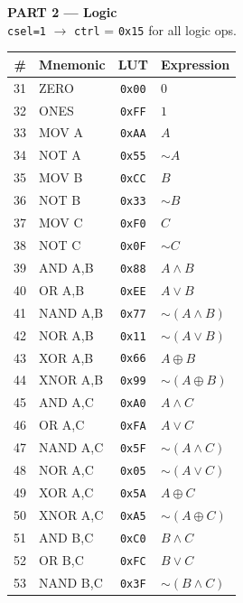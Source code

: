 \documentclass[10pt,landscape,a4paper]{article}
\begin{document}
\begin{minipage}[t]{0.22\textwidth}
        \textbf{\large \textcolor{logiccolor}{PART 2 --- Logic}} \\
    {\tiny \texttt{csel=1} $\rightarrow$ \texttt{ctrl} = \texttt{0x15} for all logic ops.}\\[0.4em]
    \scriptsize
    \begin{tabular}{@{}rlcl@{}}
    \toprule
    \textbf{\#} & \textbf{Mnemonic} & \textbf{LUT} & \textbf{Expression} \\
    \midrule
    31 & ZERO & \texttt{0x00} & $0$ \\
    32 & ONES & \texttt{0xFF} & $1$ \\
    33 & MOV A & \texttt{0xAA} & $A$ \\
    34 & NOT A & \texttt{0x55} & $\sim A$ \\
    35 & MOV B & \texttt{0xCC} & $B$ \\
    36 & NOT B & \texttt{0x33} & $\sim B$ \\
    37 & MOV C & \texttt{0xF0} & $C$ \\
    38 & NOT C & \texttt{0x0F} & $\sim C$ \\
    39 & AND A,B & \texttt{0x88} & $A \wedge B$ \\
    40 & OR A,B & \texttt{0xEE} & $A \vee B$ \\
    41 & NAND A,B & \texttt{0x77} & $\sim(A \wedge B)$ \\
    42 & NOR A,B & \texttt{0x11} & $\sim(A \vee B)$ \\
    43 & XOR A,B & \texttt{0x66} & $A \oplus B$ \\
    44 & XNOR A,B & \texttt{0x99} & $\sim(A \oplus B)$ \\
    45 & AND A,C & \texttt{0xA0} & $A \wedge C$ \\
    46 & OR A,C & \texttt{0xFA} & $A \vee C$ \\
    47 & NAND A,C & \texttt{0x5F} & $\sim(A \wedge C)$ \\
    48 & NOR A,C & \texttt{0x05} & $\sim(A \vee C)$ \\
    49 & XOR A,C & \texttt{0x5A} & $A \oplus C$ \\
    50 & XNOR A,C & \texttt{0xA5} & $\sim(A \oplus C)$ \\
    51 & AND B,C & \texttt{0xC0} & $B \wedge C$ \\
    52 & OR B,C & \texttt{0xFC} & $B \vee C$ \\
    53 & NAND B,C & \texttt{0x3F} & $\sim(B \wedge C)$ \\

\end{tabular}
\end{minipage}
\end{document}
